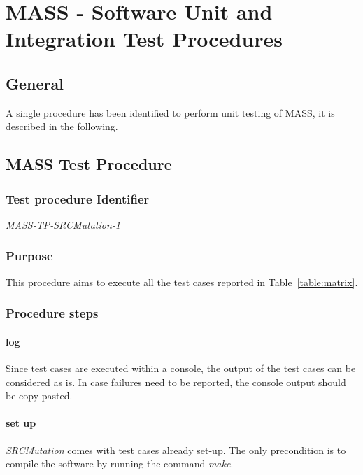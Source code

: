 
\chapter{MASS - Software Unit and Integration Test Procedures}

\section{General}

A single procedure has been identified to perform unit testing of MASS, it is described in the following.

\section{MASS Test Procedure}

\subsection{Test procedure Identifier}

\emph{MASS-TP-SRCMutation-1}


\subsection{Purpose}

This procedure aims to execute all the test cases reported in Table~\ref{table:matrix}.

\subsection{Procedure steps}

\subsubsection{log}
Since test cases are executed within a console, the output of the test cases can be considered as is. 
In case failures need to be reported, the console output should be copy-pasted.
\subsubsection{set up}
\emph{SRCMutation} comes with test cases already set-up. The only precondition is to compile the software by running the command \emph{make}.

